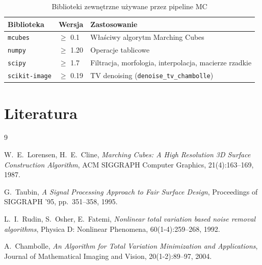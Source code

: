 \documentclass[12pt,a4paper]{article}
\begin{document}
\begin{table}[H]
\centering
\caption{Biblioteki zewnętrzne używane przez pipeline MC}
\begin{tabular}{@{}lll@{}}
\toprule
\textbf{Biblioteka} & \textbf{Wersja} & \textbf{Zastosowanie} \\
\midrule
\texttt{mcubes}          & $\geq$ 0.1    & Właściwy algorytm Marching Cubes \\
\texttt{numpy}           & $\geq$ 1.20   & Operacje tablicowe \\
\texttt{scipy}           & $\geq$ 1.7    & Filtracja, morfologia, interpolacja, macierze rzadkie \\
\texttt{scikit-image}    & $\geq$ 0.19   & TV denoising (\texttt{denoise\_tv\_chambolle}) \\
\bottomrule
\end{tabular}
\end{table}

\section*{Literatura}

\begin{thebibliography}{9}

  W.~E.~Lorensen, H.~E.~Cline,
  \textit{Marching Cubes: A High Resolution 3D Surface Construction Algorithm},
  ACM SIGGRAPH Computer Graphics, 21(4):163--169, 1987.

  G.~Taubin,
  \textit{A Signal Processing Approach to Fair Surface Design},
  Proceedings of SIGGRAPH '95, pp.~351--358, 1995.

  L.~I.~Rudin, S.~Osher, E.~Fatemi,
  \textit{Nonlinear total variation based noise removal algorithms},
  Physica D: Nonlinear Phenomena, 60(1-4):259--268, 1992.

  A.~Chambolle,
  \textit{An Algorithm for Total Variation Minimization and Applications},
  Journal of Mathematical Imaging and Vision, 20(1-2):89--97, 2004.

\end{thebibliography}
\end{document}
